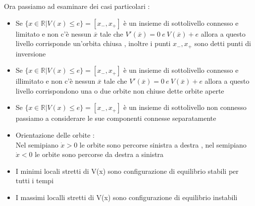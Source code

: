 \documentclass{article}
\theoremstyle{definition}
\newcommand{\R}{\mathbb{R}}
\begin{document}
 Ora passiamo ad esaminare dei casi particolari : 
 \begin{itemize}
 	\item Se $\{x \in \R | V(x)\leq e\}=[x_-,x_+]$ è un insieme di sottolivello  connesso  e limitato e non c'è nessun $\overline{x}$ tale che $V'(\overline{x})=0 \ e \ V(\overline{x})+e$  allora a questo livello corrisponde un'orbita chiusa , inoltre i punti $x_-,x_+$ sono detti punti di inversione 
 	\item 	 Se $\{x \in \R | V(x)\leq e\}=[x_-,x_+]$ è un insieme di sottolivello  connesso  e illimitato e non c'è nessun $\overline{x}$ tale che $V'(\overline{x})=0 \ e \ V(\overline{x})+e$  allora a questo livello corrispondono una o due orbite non chiuse  dette orbite aperte 
 \item Se $\{x \in \R | V(x)\leq e\}=[x_-,x_+]$ è un insieme di sottolivello  non connesso passiamo a considerare le sue componenti connesse separatamente 
 \item Orientazione delle orbite : \\ 
 Nel semipiano $\dot{x} > 0$ le orbite sono percorse  sinistra a destra , nel semipiano $\dot{x} < 0 $ le orbite sono percorse da destra a sinistra  
 \item I minimi locali stretti di V(x) sono configurazione di equilibrio stabili per tutti i tempi 
 \item  I massimi localli stretti di V(x) sono configurazione di equilibrio instabili 
 	\end{itemize}
\end{document}
